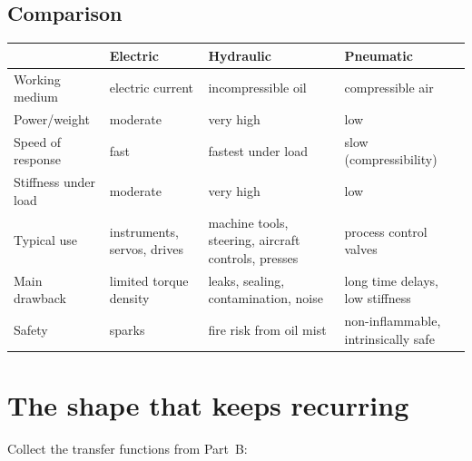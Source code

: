 \documentclass[11pt,a4paper]{article}
\begin{document}
\subsection{Comparison}

\begin{center}
\begin{tabular}{@{}p{}p{}p{}p{}@{}}
\toprule
 & \textbf{Electric} & \textbf{Hydraulic} & \textbf{Pneumatic}\\
\midrule
Working medium & electric current & incompressible oil & compressible air\\
Power/weight & moderate & very high & low\\
Speed of response & fast & fastest under load & slow (compressibility)\\
Stiffness under load & moderate & very high & low\\
Typical use & instruments, servos, drives & machine tools, steering, aircraft
controls, presses & process control valves\\
Main drawback & limited torque density & leaks, sealing, contamination, noise &
long time delays, low stiffness\\
Safety & sparks & fire risk from oil mist & non-inflammable, intrinsically
safe\\
\bottomrule
\end{tabular}
\end{center}

\section{The shape that keeps recurring}
\label{sec:shape}

Collect the transfer functions from Part~B:
\end{document}
